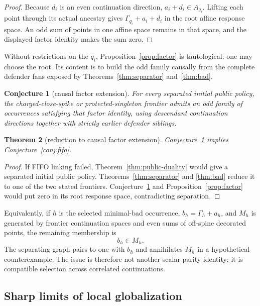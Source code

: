 \documentclass[11pt]{article}
\newtheorem{theorem}{Theorem}[section]
\newtheorem{conjecture}[theorem]{Conjecture}
\theoremstyle{definition}
\theoremstyle{remark}
\begin{document}
\begin{proof}
Because $d_i$ is an even continuation direction,
$a_i+d_i\in A_{q_i}$.  Lifting each point through its actual ancestry gives
$\Gamma_{q_i}+a_i+d_i$ in the root affine response space.  An odd sum of
points in one affine space remains in that space, and
the displayed factor identity makes the sum zero.
\end{proof}

Without restrictions on the $q_i$, Proposition~\ref{prop:factor} is
tautological: one may choose the root.  Its content is to build the odd family
causally from the complete defender fans exposed by
Theorems~\ref{thm:separator} and~\ref{thm:bad}.

\begin{conjecture}[causal factor extension]\label{conj:factor}
For every separated initial public policy, the charged-close-spike or
protected-singleton frontier admits an odd family of occurrences satisfying
that factor identity, using descendant continuation directions together with
strictly earlier defender siblings.
\end{conjecture}

\begin{theorem}[reduction to causal factor extension]\label{thm:reduction}
Conjecture~\ref{conj:factor} implies
Conjecture~\ref{conj:fifo}.
\end{theorem}

\begin{proof}
If FIFO linking failed, Theorem~\ref{thm:public-duality} would give a
separated initial public policy.  Theorems~\ref{thm:separator} and
\ref{thm:bad} reduce it to one of the two stated frontiers.
Conjecture~\ref{conj:factor} and Proposition~\ref{prop:factor} would put zero
in its root response space, contradicting separation.
\end{proof}

Equivalently, if $h$ is the selected minimal-bad occurrence,
$b_h=\Gamma_h+a_h$, and $M_h$ is generated by frontier continuation spaces
and even sums of off-spine decorated points, the remaining membership is
\[
  b_h\in M_h.
\]
The separating graph pairs to one with $b_h$ and annihilates $M_h$ in a
hypothetical counterexample.  The issue is therefore not another scalar
parity identity; it is compatible selection across correlated continuations.

\subsection{Sharp limits of local globalization}
\end{document}
